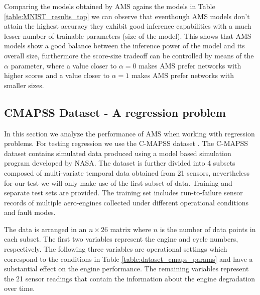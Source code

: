 \documentclass[journal]{IEEEtran}
\begin{document}
Comparing the models obtained by AMS agains the models in Table \ref{table:MNIST_results_top} we can observe that eventhough AMS models don't attain the highest accuracy they exhibit good inference capabilities with a much lesser number of trainable parameters (size of the model). This shows that AMS models show a good balance between the inference power of the model and its overall size, furthermore the score-size tradeoff can be controlled by means of the $\alpha$ parameter, where a value closer to $\alpha=0$ makes AMS prefer networks with higher scores and a value closer to $\alpha = 1$ makes AMS prefer networks with smaller sizes.


\subsection{CMAPSS Dataset - A regression problem}

In this section we analyze the performance of AMS when working with regression problems. For testing regression we use the C-MAPSS dataset \cite{CMAPS2008}. The C-MAPSS dataset contains simulated data produced using a model based simulation program developed by NASA. The dataset is further divided into 4 subsets composed of multi-variate temporal data obtained from 21 sensors, nevertheless for our test we will only make use of the first subset of data. Training and separate test sets are provided. The training set includes run-to-failure sensor records of multiple aero-engines collected under different operational conditions and fault modes.

The data is arranged in an $n\times26$ matrix where $n$ is the number of data points in each subset. The first two variables represent the engine and cycle
numbers, respectively. The following three variables are operational settings which correspond to the conditions in Table \ref{table:dataset_cmaps_params} and have a
substantial effect on the engine performance. The remaining variables represent the 21 sensor readings that contain the information about the engine
degradation over time.

\begin{table}[!htb]
\begin{center}
\end{center}
\caption{CMAPSS dataset details.}
\label{table:dataset_cmaps_params}
\end{table}
\end{document}
